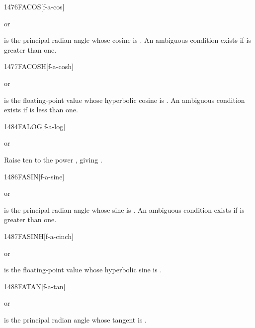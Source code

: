 \begin{worddef}{1476}{FACOS}[f-a-cos]
\item {} or

	 is the principal radian angle whose cosine is
	. An ambiguous condition exists if  is
	greater than one.
\end{worddef}


\begin{worddef}{1477}{FACOSH}[f-a-cosh]
\item {} or

	 is the floating-point value whose hyperbolic cosine is
	. An ambiguous condition exists if  is less
	than one.
\end{worddef}


\begin{worddef}{1484}{FALOG}[f-a-log]
\item {} or

	Raise ten to the power , giving .
\end{worddef}


\begin{worddef}{1486}{FASIN}[f-a-sine]
\item {} or

	 is the principal radian angle whose sine is .
	An ambiguous condition exists if  is greater than one.
\end{worddef}



\begin{worddef}{1487}{FASINH}[f-a-cinch]
\item {} or

	 is the floating-point value whose hyperbolic sine is
	.
\end{worddef}


\begin{worddef}{1488}{FATAN}[f-a-tan]
\item {} or

	 is the principal radian angle whose tangent is
	.
\end{worddef}

